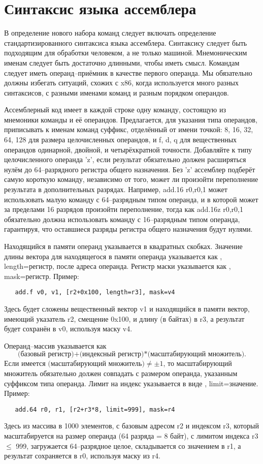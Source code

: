\documentclass[forwardcom.tex]{subfiles}
\begin{document}
\section{Синтаксис языка ассемблера} \label{assemblySyntax}
В определение нового набора команд следует включать определение стандартизированного синтаксиса языка ассемблера. Синтаксису следует быть подходящим для обработки человеком, а не только машиной. Мнемоническим именам следует быть достаточно длинными, чтобы иметь смысл. Командам следует иметь операнд--приёмник в качестве первого операнда. Мы обязательно должны избегать ситуаций, схожих с x86, когда используется много разных синтаксисов, с разными именами команд и разным порядком операндов.

Ассемблерный код имеет в каждой строке одну команду, состоящую из мнемоники команды и её операндов. Предлагается, для указания типа операндов, приписывать к именам команд суффикс, отделённый от имени точкой:  8, 16, 32, 64, 128 для размера целочисленных операндов, и f, d, q для вещественных операндов одинарной, двойной, и четырёхкратной точности. Добавляйте к типу целочисленного операнда 'z', если результат обязательно должен расширяться нулём до 64--разрядного регистра общего назначения. Без 'z' ассемблер подберёт самую короткую команду, независимо от того, может ли произойти переполнение результата в дополнительных разрядах. Например, add.16 r0,r0,1 может использовать малую команду с 64--разрядным типом операнда, и в которой может за пределами 16 разрядов произойти переполнение, тогда как add.16z r0,r0,1 обязательно должна использовать команду с 16--разрядным типом операнда, гарантируя, что оставшиеся разряды регистра общего назначения будут нулями.

Находящийся в памяти операнд указывается в квадратных скобках. Значение длины вектора для находящегося в памяти операнда указывается как \glqq, length=регистр\grqq, после адреса операнда. Регистр маски указывается как \glqq, mask=регистр\grqq. Пример:
\begin{verbatim}
   add.f v0, v1, [r2+0x100, length=r3], mask=v4
\end{verbatim}
Здесь будет сложены вещественный вектор v1 и находящийся в памяти вектор, имеющий указатель r2, смещение 0x100, и длину (в байтах) в r3, а результат будет сохранён в v0, используя маску v4. 

Операнд--массив указывается как
$$
\texttt{(базовый регистр)+(индексный регистр)*(масштабирующий множитель)}.
$$
Если имеется $\text{(масштабирующий множитель)}\neq\pm1$, то масштабирующий множитель обязательно должен совпадать с размером операнда, указанным суффиксом типа операнда. Лимит на индекс указывается в виде \glqq, limit=значение\grqq. Пример:
\begin{verbatim}
   add.64 r0, r1, [r2+r3*8, limit=999], mask=r4
\end{verbatim}
Здесь из массива в 1000 элементов, с базовым адресом r2 и индексом r3, который масштабируется на размер операнда (64 разряда = 8 байт), с лимитом индекса r3 $\leq$ 999, загружается 64--разрядное целое, складывается со значением в r1, а результат сохраняется в r0, используя маску из r4.
\end{document}
